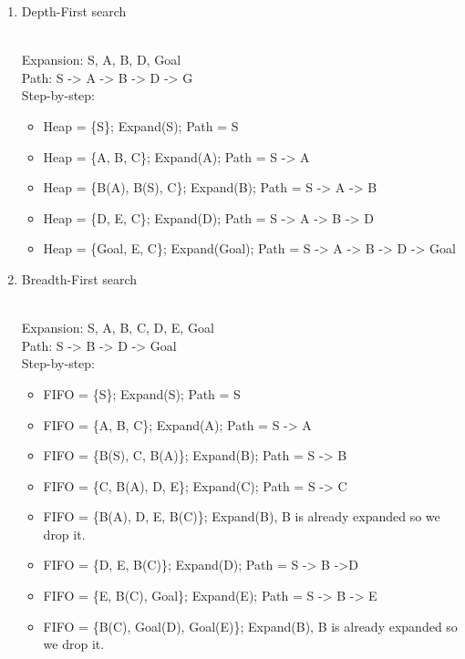 \documentclass[9pt,a4paper]{extarticle}
\newenvironment{solution}
    {%
    \color{red}
    }
    { 
    \color{black}
    }
\begin{document}
    \begin{enumerate}
        \item Depth-First search
        \begin{solution}
        \\
        Expansion: S, A, B, D, Goal \\
        Path: S -> A -> B -> D -> G \\
        Step-by-step:
        \begin{itemize}
            \item Heap = \{S\}; Expand(S); Path = S
            \item Heap = \{A, B, C\}; Expand(A); Path = S -> A
            \item Heap = \{B(A), B(S), C\}; Expand(B); Path = S -> A -> B
            \item Heap = \{D, E, C\}; Expand(D); Path = S -> A -> B -> D
            \item Heap = \{Goal, E, C\}; Expand(Goal); Path = S -> A -> B -> D -> Goal
        \end{itemize}
        \end{solution}
        \item Breadth-First search
        \begin{solution}
        \\
        Expansion: S, A, B, C, D, E, Goal \\
        Path: S -> B -> D -> Goal \\
        Step-by-step:
        \begin{itemize}
            \item FIFO = \{S\}; Expand(S); Path = S
            \item FIFO = \{A, B, C\}; Expand(A); Path = S -> A
            \item FIFO = \{B(S), C, B(A)\}; Expand(B); Path = S -> B
            \item FIFO = \{C, B(A), D, E\}; Expand(C); Path = S -> C
            \item FIFO = \{B(A), D, E, B(C)\}; Expand(B), B is already expanded so we drop it.
            \item FIFO = \{D, E, B(C)\}; Expand(D); Path = S -> B ->D
            \item FIFO = \{E, B(C), Goal\}; Expand(E); Path = S -> B -> E
            \item FIFO = \{B(C), Goal(D), Goal(E)\}; Expand(B), B is already expanded so we drop it.

\end{itemize}
\end{solution}
\end{enumerate}
\end{document}
